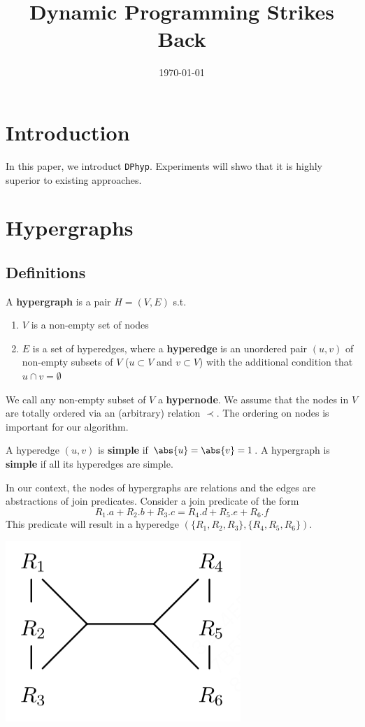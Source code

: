 \documentclass[11pt]{article}
\date{\today}
\title{Dynamic Programming Strikes Back}
\begin{document}
\maketitle
\section{Introduction}
\label{sec:org8e58a5c}
In this paper, we introduct \texttt{DPhyp}. Experiments will shwo that it is highly superior to existing
approaches.
\section{Hypergraphs}
\label{sec:org783f34e}
\subsection{Definitions}
\label{sec:org15be184}
\begin{definition}[Hypergraph]
A \textbf{hypergraph} is a pair \(H=(V,E)\) s.t.
\begin{enumerate}
\item \(V\) is a non-empty set of nodes
\item \(E\) is a set of hyperedges, where a \textbf{hyperedge} is an unordered pair \((u,v)\) of non-empty subsets
of \(V\) (\(u\subset V\) and \(v\subset V\)) with the additional condition that \(u\cap
           v=\emptyset\)
\end{enumerate}

We call any non-empty subset of \(V\) a \textbf{hypernode}. We assume that the nodes in \(V\) are totally
ordered via an (arbitrary) relation \(\prec\). The ordering on nodes is important for our algorithm.

A hyperedge \((u,v)\) is \textbf{simple} if \(\abs{u}=\abs{v}=1\). A hypergraph is \textbf{simple} if all its hyperedges
are simple.
\end{definition}

In our context, the nodes of hypergraphs are relations and the edges are abstractions of join
predicates. Consider a join predicate of the form
\begin{equation*}
R_1.a+R_2.b+R_3.c=R_4.d+R_5.e+R_6.f
\end{equation*}
This predicate will result in a hyperedge \((\{R_1,R_2,R_3\}, \{R_4,R_5,R_6\})\).


\begin{center}
\includegraphics[width=.5\textwidth]{../../images/papers/94.png}
\end{center}
\end{document}
